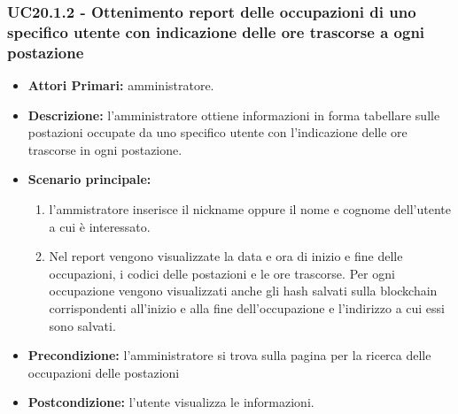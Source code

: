 \subsubsection{ UC20.1.2 - Ottenimento report delle occupazioni di uno specifico utente con indicazione delle ore trascorse a ogni postazione}
\begin{itemize}
	\item\textbf{Attori Primari:} 
	amministratore.
	\item\textbf{Descrizione:} 
	l'amministratore ottiene informazioni in forma tabellare sulle postazioni occupate da uno specifico utente con l'indicazione delle ore trascorse in ogni postazione.
	\item\textbf{Scenario principale:}
	\begin{enumerate}
		\item l'ammistratore inserisce il nickname oppure il nome e cognome dell'utente a cui è interessato.
		\item Nel report vengono visualizzate la data e ora di inizio e fine delle occupazioni, i codici delle postazioni e le ore trascorse.
		Per ogni occupazione vengono visualizzati anche gli hash salvati sulla blockchain corrispondenti all'inizio e alla fine dell'occupazione e l'indirizzo a cui essi sono salvati.
	\end{enumerate}
	\item\textbf{Precondizione:} 
	l'amministratore si trova sulla pagina per la ricerca delle occupazioni delle postazioni
	\item\textbf{Postcondizione:}
	l'utente visualizza le informazioni.
\end{itemize}


